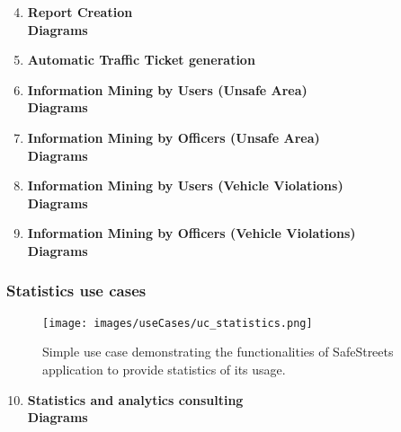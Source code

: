 \newpage
\begin{enumerate}
	\setcounter{enumi}{3}
	\item \textbf{Report Creation}\\
		
		\newpage
		\textbf{Diagrams}
		\newpage
	\item \textbf{Automatic Traffic Ticket generation}\\
		
		\newpage
	\item \textbf{Information Mining by Users (Unsafe Area)}\\
		
		\newpage
		\textbf{Diagrams}
		\newpage
	\item \textbf{Information Mining by Officers (Unsafe Area)}\\
		
		\newpage
		\textbf{Diagrams}
		\newpage
	\item \textbf{Information Mining by Users (Vehicle Violations)}\\
		
		\newpage
		\textbf{Diagrams}
		\newpage
	\item \textbf{Information Mining by Officers (Vehicle Violations)}\\
		
		\newpage
		\textbf{Diagrams}
		\newpage
\end{enumerate}
\newpage


\subsubsection{Statistics use cases}
\begin{figure}[htp]
	\centering
	\texttt{[image: images/useCases/uc\_statistics.png]}
	\caption{Simple use case demonstrating the functionalities of SafeStreets application to provide statistics of its usage.} 
	\label{fig:statisticsuc} 
\end{figure}

\newpage
\begin{enumerate}
	\setcounter{enumi}{9}
	\item \textbf{Statistics and analytics consulting}\\
	
	\newpage
	\textbf{Diagrams}
	\newpage
\end{enumerate}
\newpage

